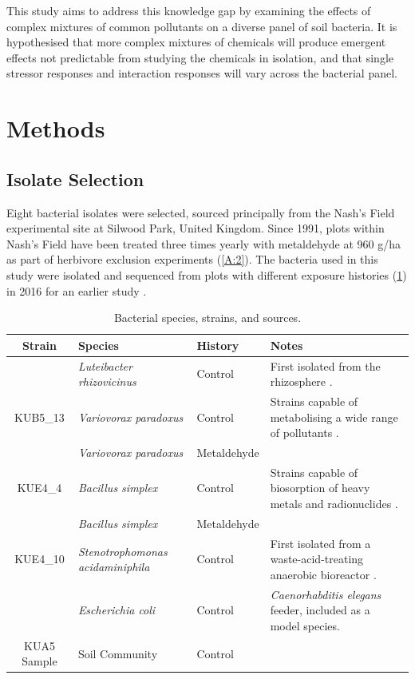 \documentclass[10pt]{article}
\begin{document}
This study aims to address this knowledge gap by examining the effects of complex mixtures of common pollutants on a diverse panel of soil bacteria. It is hypothesised that more complex mixtures of chemicals will produce emergent effects not predictable from studying the chemicals in isolation, and that single stressor responses and interaction responses will vary across the bacterial panel.

\section{Methods}
\label{S:2}
\subsection{Isolate Selection}
\label{S:2:1}

Eight bacterial isolates were selected, sourced principally from the Nash's Field experimental site at Silwood Park, United Kingdom. Since 1991, plots within Nash's Field have been treated three times yearly with metaldehyde at 960 g/ha as part of herbivore exclusion experiments \cite{Allan2011ContrastingExperiment} (\cref{A:2}). The bacteria used in this study were isolated and sequenced from plots with different exposure histories (\cref{tab:isolates}) in 2016 for an earlier study \cite{Mombrikotb2016}. 

\begin{table}[ht]
\begin{small}
\caption{Bacterial species, strains, and sources.}
\centering
\begin{tabular}{c p{3.1cm} l p{5.2cm}}
\toprule 
\textbf{{Strain}} & \textbf{{Species}} & \textbf{{History}} & \textbf{{Notes}} \\
\midrule
\rowcolor{gggrey}{LUF4\_5} & \textit{Luteibacter rhizovicinus} & Control & First isolated from the rhizosphere \cite{Johansen2005LuteibacterL.}. \\
{KUB5\_13} & \textit{Variovorax paradoxus} & Control & Strains capable of metabolising a wide range of pollutants \cite{Satola2013MetabolicParadoxus}. \\
\rowcolor{gggrey}{NUF1\_3} & \textit{Variovorax paradoxus} & Metaldehyde & \\
{KUE4\_4} & \textit{Bacillus simplex} & Control & Strains capable of biosorption of heavy metals and radionuclides \cite{Valentine1996BiosorptionZone}. \\
\rowcolor{gggrey}{NUE1\_1} & \textit{Bacillus simplex} & Metaldehyde & \\
{KUE4\_10} & \textit{Stenotrophomonas \newline acidaminiphila} & Control & First isolated from a waste-acid-treating anaerobic bioreactor \cite{Assih2002}. \\
\rowcolor{gggrey}{OP50} & \textit{Escherichia coli} & Control & \textit{Caenorhabditis elegans} feeder\cite{Stiernagle2006}, included as a model species. \\
{KUA5 Sample} & Soil Community & Control & \\
\bottomrule
\end{tabular}
\label{tab:isolates}
\end{small}
\end{table}
\end{document}
